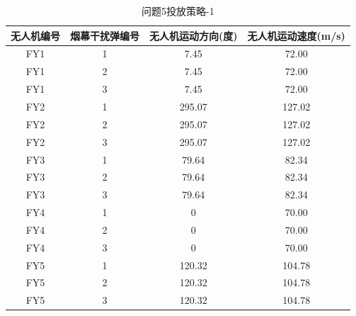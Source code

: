\documentclass[../main.tex]{subfiles}
\begin{document}
\begin{table}[H]
\caption{问题5投放策略-1}
\label{tab:...001} 
\centering
\begin{scriptsize}
\begin{tabular}{cccc}
\toprule[1.5pt]
无人机编号 & 烟幕干扰弹编号 & 无人机运动方向(度) & 无人机运动速度(m/s)  \\  
\midrule[1pt]
FY1        & 1              & 7.45               & 72.00                \\               
FY1        & 2              & 7.45               & 72.00                \\               
FY1        & 3              & 7.45               & 72.00                \\                
FY2        & 1              & 295.07             & 127.02               \\                
FY2        & 2              & 295.07             & 127.02               \\               
FY2        & 3              & 295.07             & 127.02               \\               
FY3        & 1              & 79.64              & 82.34                \\               
FY3        & 2              & 79.64              & 82.34                \\                
FY3        & 3              & 79.64              & 82.34                \\                
FY4        & 1              & 0                  & 70.00                \\                
FY4        & 2              & 0                  & 70.00                \\               
FY4        & 3              & 0                  & 70.00                \\               
FY5        & 1              & 120.32             & 104.78               \\               
FY5        & 2              & 120.32             & 104.78               \\                
FY5        & 3              & 120.32             & 104.78               \\               
\bottomrule[1.5pt]
\end{tabular}
\end{scriptsize}
\end{table}
\end{document}
